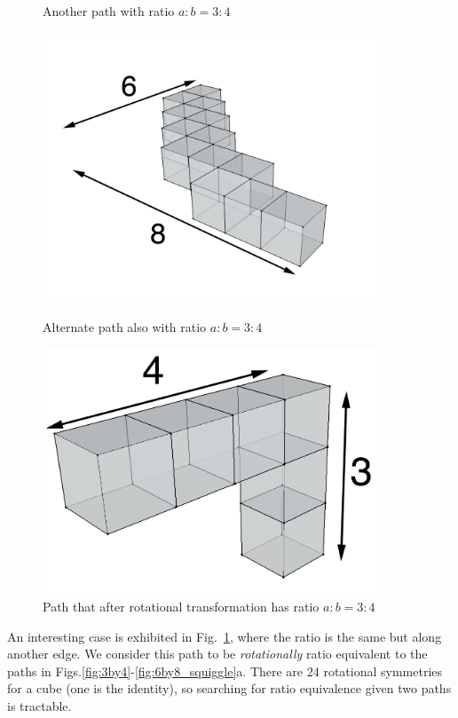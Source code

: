 \begin{figure}
\begin{minipage}[t]{.45\textwidth}
    \caption{Another path with ratio $a:b = 3:4$}
    \label{fig:6by8}
  \end{minipage}\hfill
  \begin{minipage}[t]{.45\textwidth}
  \centering
  \includegraphics[width=0.9\textwidth]{./figures/6by8_squiggle}
    \caption{Alternate path also with ratio $a:b = 3:4$}
		\label{fig:6by8_squiggle}
  \end{minipage}
  \begin{minipage}[t]{.45\textwidth}
  \centering
  \includegraphics[width=0.9\textwidth]{./figures/3by4_upended.png}
  \caption{Path that after rotational transformation has ratio $a:b=3:4$} 
  \label{fig:3by4_upended}
  \end{minipage}\hfill
\end{figure}

    
An interesting case is exhibited in Fig.~\ref{fig:3by4_upended}, where the ratio is the same but along another edge.
We consider this path to be \emph{rotationally} ratio equivalent to the paths in Figs.\ref{fig:3by4}-\ref{fig:6by8_squiggle}a.
There are 24 rotational symmetries for a cube (one is the identity), so searching for ratio equivalence given two paths is tractable.

